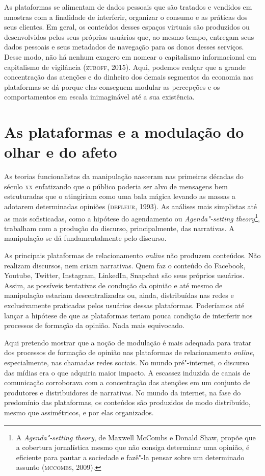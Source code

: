 As plataformas se alimentam de dados pessoais que são tratados e
vendidos em amostras com a finalidade de interferir, organizar o consumo
e as práticas dos seus clientes. Em geral, os conteúdos desses espaços
virtuais são produzidos ou desenvolvidos pelos seus próprios usuários
que, ao mesmo tempo, entregam seus dados pessoais e seus metadados de
navegação para os donos desses serviços. Desse modo, não há nenhum
exagero em nomear o capitalismo informacional em capitalismo de
vigilância (\textsc{zuboff}, 2015). Aqui, podemos realçar que a grande
concentração das atenções e do dinheiro dos demais segmentos da economia
nas plataformas se dá porque elas conseguem modular as percepções e os
comportamentos em escala inimaginável até a sua existência.

\section{As plataformas e a modulação do olhar e do afeto}

\noindent{}As teorias funcionalistas da manipulação nasceram nas primeiras décadas
do século \textsc{xx} enfatizando que o público poderia ser alvo de mensagens bem
estruturadas que o atingiriam como uma bala mágica levando as massas a
adotarem determinadas opiniões (\textsc{defleur}, 1993). As análises mais
simplistas até as mais sofisticadas, como a hipótese do agendamento ou
\emph{Agenda"-setting theory}\footnote{A \emph{Agenda"-setting theory}, de
  Maxwell McCombs e Donald Shaw, propõe que a cobertura jornalística
  mesmo que não consiga determinar uma opinião, é eficiente para pautar a
  sociedade e fazê"-la pensar sobre um determinado assunto (\textsc{mccombs}, 2009).}, trabalham com a produção do discurso, principalmente, das narrativas. A manipulação se dá
fundamentalmente pelo discurso.

As principais plataformas de relacionamento \emph{online} não produzem
conteúdos. Não realizam discursos, nem criam narrativas. Quem faz o
conteúdo do Facebook, Youtube, Twitter, Instagram, LinkedIn, Snapchat
são seus próprios usuários. Assim, as possíveis tentativas de condução
da opinião e até mesmo de manipulação estariam descentralizadas ou,
ainda, distribuídas nas redes e exclusivamente praticadas pelos usuários
dessas plataformas. Poderíamos até lançar a hipótese de que as
plataformas teriam pouca condição de interferir nos processos de
formação da opinião. Nada mais equivocado.

Aqui pretendo mostrar que a noção de modulação é mais adequada para
tratar dos processos de formação de opinião nas plataformas de
relacionamento \emph{online}, especialmente, nas chamadas redes sociais. No
mundo pré"-internet, o discurso das mídias era o que adquiria maior
impacto. A escassez induzida de canais de comunicação corroborava com a
concentração das atenções em um conjunto de produtores e distribuidores
de narrativas. No mundo da internet, na fase do predomínio das
plataformas, os conteúdos são produzidos de modo distribuído, mesmo que
assimétricos, e por elas organizados.

